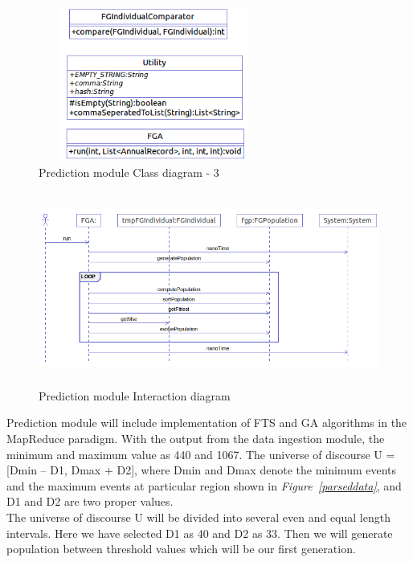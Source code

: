 \documentclass[12pt,journal,compsoc]{IEEEtran}
\begin{document}
\begin{figure}
\includegraphics[height=2in,width=3in]{gafts_class_3}
\caption{Prediction module Class diagram - 3}
\label{gafts_class_3}
\end{figure}

\begin{figure}
\includegraphics[height=2.5in,width=6.5in]{gafts_interact}
\caption{Prediction module Interaction diagram}
\label{gafts_interact}
\end{figure}

\indent Prediction module will include implementation of FTS and GA algorithms in the MapReduce paradigm. With the output from  the data ingestion module, the minimum and maximum value as 440 and 1067. The universe of discourse U = [Dmin – D1, Dmax + D2], where Dmin and Dmax denote the minimum events and the maximum events at particular region shown in \emph{Figure~\ref{parseddata}}, and D1 and D2 are two proper values. \\
\indent The universe of discourse U will be divided into several even and equal length intervals. Here we have selected D1 as 40 and D2 as 33. Then we will generate population between threshold values which will be our first generation.\\
\end{document}
